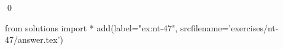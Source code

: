 
\begin{ex} 
  \label{ex:nt-47}
  
  \qed
\end{ex} 
\begin{python0}
from solutions import *
add(label="ex:nt-47",
    srcfilename='exercises/nt-47/answer.tex') 
\end{python0}

